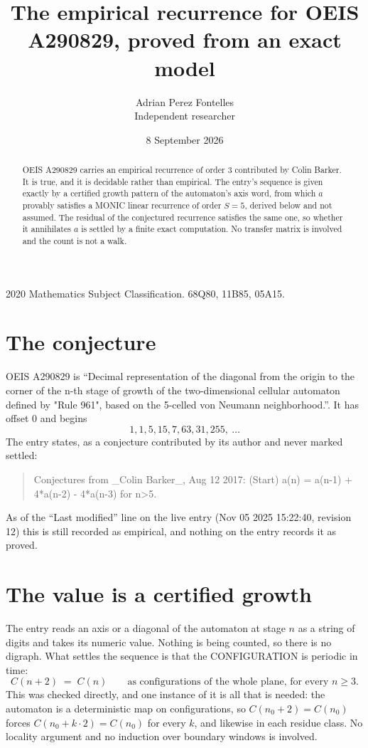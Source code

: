 \documentclass[11pt,a4paper]{article}
\title{The empirical recurrence for OEIS A290829, proved from an exact model}
\author{Adrian Perez Fontelles\\ \small Independent researcher}
\date{8 September 2026}
\theoremstyle{plain}
\theoremstyle{definition}
\begin{document}
\maketitle

\begin{abstract}
OEIS A290829 carries an empirical recurrence of order $3$ contributed by Colin Barker. It is true, and it is
decidable rather than empirical. The entry's sequence is given exactly by a certified growth pattern of the automaton's axis word, from
which $a$ provably satisfies a MONIC linear recurrence of order $S=5$, derived below and not
assumed. The residual of the conjectured recurrence satisfies the same one, so whether it
annihilates $a$ is settled by a finite exact computation. No transfer matrix is involved and
the count is not a walk.
\end{abstract}

\noindent\small 2020 Mathematics Subject Classification. 68Q80, 11B85, 05A15.\normalsize

\section{The conjecture}

OEIS A290829 is ``Decimal representation of the diagonal from the origin to the corner of the n-th stage of growth of the two-dimensional cellular automaton defined by "Rule 961", based on the 5-celled von Neumann neighborhood.''. It has offset $0$ and begins
\[
1, 1, 5, 15, 7, 63, 31, 255,\ \dots
\]
The entry states, as a conjecture contributed by its author and never marked settled:
\begin{quote}
Conjectures from \_Colin Barker\_, Aug 12 2017: (Start) a(n) = a(n-1) + 4*a(n-2) - 4*a(n-3) for n>5.
\end{quote}
As of the ``Last modified'' line on the live entry (Nov 05 2025 15:22:40, revision 12)
this is still recorded as empirical, and nothing on the entry records it as proved.

\section{The value is a certified growth}

The entry reads an axis or a diagonal of the automaton at stage $n$ as a string of digits and
takes its numeric value. Nothing is being counted, so there is no digraph. What settles the
sequence is that the CONFIGURATION is periodic in time:
\[
C(n+2)\;=\;C(n)\qquad\text{as configurations of the whole plane, for every } n\ge 3.
\]
This was checked directly, and one instance of it is all that is needed: the automaton is a
deterministic map on configurations, so $C(n_0+2)=C(n_0)$ forces $C(n_0+k\cdot2)=C(n_0)$ for
every $k$, and likewise in each residue class. No locality argument and no induction over
boundary windows is involved.
\end{document}

